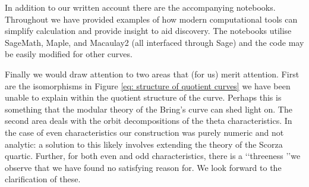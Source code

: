 \documentclass{amsart}
\begin{document}
In addition to our written account there are the accompanying notebooks.
Throughout 
we have provided examples of how modern computational tools can simplify calculation and provide insight to aid discovery. The
notebooks utilise SageMath, Maple, and Macaulay2 (all interfaced through Sage) and the code may be easily modified for other curves.

Finally we would draw attention to two areas that (for us) merit attention. First are the isomorphisms in Figure \ref{eq: structure of quotient curves} we have been unable to explain within the quotient structure of the curve. Perhaps this is something that the modular theory of the Bring's curve can shed light on. 
The second area deals with the orbit decompositions of the  theta characteristics. In the case of even characteristics our construction was purely numeric and not analytic: a solution to this  likely involves extending the theory of the Scorza quartic. Further, for both even and odd characteristics, there is a \lq\lq threeness \rq\rq we observe that we have found no satisfying reason for. We look forward to the clarification of these.



\providecommand{\bysame}{\leavevmode\hbox
to3em{\hrulefill}\thinspace}
% 
% 
\end{document}
